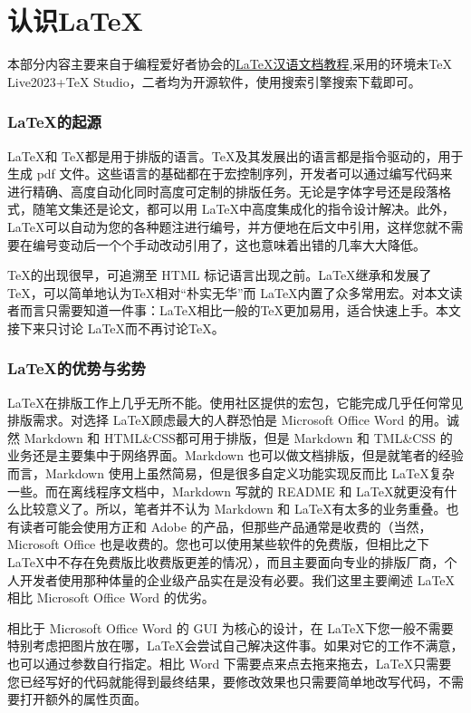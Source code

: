 \setcounter{page}{1}
\part{认识\LaTeX }
本部分内容主要来自于编程爱好者协会的\href{https://github.com/NCUT-Coders/LaTeX-Tutorial}{\LaTeX 汉语文档教程},采用的环境未TeX Live2023+TeX Studio，二者均为开源软件，使用搜索引擎搜索下载即可。

\section{\LaTeX 的起源}
\LaTeX 和 \TeX 都是用于排版的语言。\TeX 及其发展出的语言都是指令驱动的，用于生成 pdf 文件。这些语言的基础都在于宏控制序列，开发者可以通过编写代码来进行精确、高度自动化同时高度可定制的排版任务。无论是字体字号还是段落格式，随笔文集还是论文，都可以用 \LaTeX 中高度集成化的指令设计解决。此外，\LaTeX 可以自动为您的各种题注进行编号，并方便地在后文中引用，这样您就不需要在编号变动后一个个手动改动引用了，这也意味着出错的几率大大降低。

​\TeX 的出现很早，可追溯至 HTML 标记语言出现之前。\LaTeX 继承和发展了\TeX，可以简单地认为\TeX 相对“朴实无华”而 \LaTeX 内置了众多常用宏。对本文读者而言只需要知道一件事：\LaTeX 相比一般的\TeX 更加易用，适合快速上手。本文接下来只讨论 \LaTeX 而不再讨论\TeX。

\section{\LaTeX 的优势与劣势}
\LaTeX 在排版工作上几乎无所不能。使用社区提供的宏包，它能完成几乎任何常见排版需求。对选择 \LaTeX 顾虑最大的人群恐怕是 Microsoft Office Word 的用。诚然 Markdown 和 HTML\&CSS都可用于排版，但是 Markdown 和 TML\&CSS 的业务还是主要集中于网络界面。Markdown 也可以做文档排版，但是就笔者的经验而言，Markdown 使用上虽然简易，但是很多自定义功能实现反而比 \LaTeX 复杂一些。而在离线程序文档中，Markdown 写就的 README 和 \LaTeX 就更没有什么比较意义了。所以，笔者并不认为 Markdown 和 \LaTeX 有太多的业务重叠。也有读者可能会使用方正和 Adobe 的产品，但那些产品通常是收费的（当然，Microsoft Office 也是收费的。您也可以使用某些软件的免费版，但相比之下 \LaTeX 中不存在免费版比收费版更差的情况），而且主要面向专业的排版厂商，个人开发者使用那种体量的企业级产品实在是没有必要。我们这里主要阐述 \LaTeX 相比 Microsoft Office Word 的优劣。

相比于 Microsoft Office Word 的 GUI 为核心的设计，在 \LaTeX 下您一般不需要特别考虑把图片放在哪，\LaTeX 会尝试自己解决这件事。如果对它的工作不满意，也可以通过参数自行指定。相比 Word 下需要点来点去拖来拖去，\LaTeX 只需要您已经写好的代码就能得到最终结果，要修改效果也只需要简单地改写代码，不需要打开额外的属性页面。


